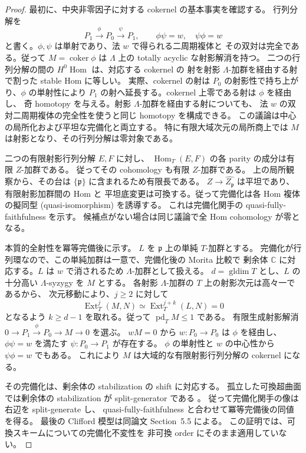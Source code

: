 \begin{proof}
最初に、中央非零因子に対する cokernel の基本事実を確認する。
行列分解を
\[
 P_1\xrightarrow{\phi}P_0\xrightarrow{\psi}P_1,
 \qquad \phi\psi=w,\quad\psi\phi=w
\]
と書く。$\phi,\psi$ は単射であり、法 $w$ で得られる二周期複体と
その双対は完全である。従って $M=\operatorname{coker}\phi$ は
$\Lambda$ 上の totally acyclic な射影解消を持つ。
二つの行列分解の間の $H^0\operatorname{Hom}$ は、対応する cokernel の
射を射影 $\Lambda$-加群を経由する射で割った stable Hom に等しい。
実際、cokernel の射は $P_0$ の射影性で持ち上がり、$\phi$ の単射性により
$P_1$ の射へ延長する。cokernel 上零である射は $\phi$ を経由し、
奇 homotopy を与える。射影 $\Lambda$-加群を経由する射についても、
法 $w$ の双対二周期複体の完全性を使うと同じ homotopy を構成できる。
この議論は中心の局所化および平坦な完備化と両立する。
特に有限大域次元の局所商上では $M$ は射影となり、その行列分解は零対象である。

二つの有限射影行列分解 $E,F$ に対し、
$\operatorname{Hom}_{T}(E,F)$ の各 parity の成分は有限 $Z$-加群である。
従ってその cohomology も有限 $Z$-加群である。
上の局所観察から、その台は $\{\mathfrak p\}$ に含まれるため有限長である。
$Z\to\widehat{Z_{\mathfrak p}}$ は平坦であり、有限射影加群間の Hom と
平坦底変更は可換する。従って完備化は各 Hom 複体の擬同型
(quasi-isomorphism) を誘導する。
これは完備化関手の quasi-fully-faithfulness を示す。
候補点がない場合は同じ議論で全 Hom cohomology が零となる。

本質的全射性を冪等完備後に示す。
$L$ を $\mathfrak p$ 上の単純 $T$-加群とする。
完備化が行列環なので、この単純加群は一意で、完備化後の Morita 比較で
剰余体 $\mathbb C$ に対応する。$L$ は $w$ で消されるため
$\Lambda$-加群として扱える。
$d=\operatorname{gldim}T$ とし、$L$ の十分高い $\Lambda$-syzygy を $M$ とする。
各射影 $\Lambda$-加群の $T$ 上の射影次元は高々一であるから、
次元移動により、$j\ge2$ に対して
\[
 \operatorname{Ext}_T^j(M,N)
 \simeq \operatorname{Ext}_T^{j+k}(L,N)=0
\]
となるよう $k\ge d-1$ を取れる。従って $\operatorname{pd}_T M\le1$ である。
有限生成射影解消 $0\to P_1\xrightarrow\phi P_0\to M\to0$ を選ぶ。
$wM=0$ から $w:P_0\to P_0$ は $\phi$ を経由し、
$\phi\psi=w$ を満たす $\psi:P_0\to P_1$ が存在する。
$\phi$ の単射性と $w$ の中心性から $\psi\phi=w$ でもある。
これにより $M$ は大域的な有限射影行列分解の cokernel になる。

その完備化は、剰余体の stabilization の shift に対応する。
孤立した可換超曲面では剰余体の stabilization が split-generator である
\cite[Theorems~4.1 and~5.2]{ROGDyckerhoff}。
従って完備化関手の像は右辺を split-generate し、
quasi-fully-faithfulness と合わせて冪等完備後の同値を得る。
最後の Clifford 模型は同論文 Section~5.5 による。
この証明では、可換スキームについての完備化不変性を
非可換 order にそのまま適用していない。
\end{proof}

